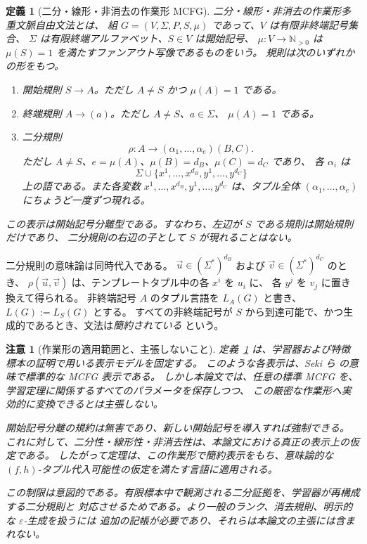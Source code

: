 \documentclass[11pt,a4paper]{ltjsarticle}
\newtheorem{definition}[theorem]{定義}
\newtheorem{remark}[theorem]{注意}
\theoremstyle{remark}
\newcommand{\tuple}[1]{\vec{#1}}
\newcommand{\eps}{\varepsilon}
\begin{document}
\begin{definition}[二分・線形・非消去の作業形 MCFG]
\label{def:working-mcfg}
\emph{二分・線形・非消去の作業形多重文脈自由文法}とは、
組 \(G=(V,\Sigma,P,S,\mu)\) であって、\(V\) は有限非終端記号集合、
\(\Sigma\) は有限終端アルファベット、\(S\in V\) は開始記号、
\(\mu\colon V\to\mathbb N_{>0}\) は \(\mu(S)=1\) を満たすファンアウト写像であるものをいう。
規則は次のいずれかの形をもつ。
\begin{enumerate}[label=(\roman*),leftmargin=*]
\item 開始規則 \(S\to A\)。ただし \(A\ne S\) かつ \(\mu(A)=1\) である。
\item 終端規則 \(A\to(a)\)。ただし \(A\ne S\)、\(a\in\Sigma\)、
\(\mu(A)=1\) である。
\item 二分規則
\[
  \rho\colon A\to(\alpha_1,\ldots,\alpha_e)(B,C).
\]
ただし \(A\ne S\)、\(e=\mu(A)\)、\(\mu(B)=d_B\)、\(\mu(C)=d_C\) であり、
各 \(\alpha_i\) は
\[
  \Sigma\cup\{x^1,\ldots,x^{d_B},y^1,\ldots,y^{d_C}\}
\]
上の語である。また各変数
\(x^1,\ldots,x^{d_B},y^1,\ldots,y^{d_C}\) は、タプル全体
\((\alpha_1,\ldots,\alpha_e)\) にちょうど一度ずつ現れる。
\end{enumerate}
この表示は\emph{開始記号分離型}である。すなわち、左辺が \(S\) である規則は開始規則だけであり、
二分規則の右辺の子として \(S\) が現れることはない。
\end{definition}

二分規則の意味論は同時代入である。
\(\tuple u\in(\Sigma^*)^{d_B}\) および \(\tuple v\in(\Sigma^*)^{d_C}\) のとき、
\(\rho(\tuple u,\tuple v)\) は、テンプレートタプル中の各 \(x^i\) を \(u_i\) に、
各 \(y^j\) を \(v_j\) に置き換えて得られる。
非終端記号 \(A\) のタプル言語を \(L_A(G)\) と書き、\(L(G):=L_S(G)\) とする。
すべての非終端記号が \(S\) から到達可能で、かつ生成的であるとき、文法は\emph{簡約されている}
という。

\begin{remark}[作業形の適用範囲と、主張しないこと]
\label{rem:working-form-scope}
定義~\ref{def:working-mcfg} は、学習器および特徴標本の証明で用いる表示モデルを固定する。
このような各表示は、Seki ら \cite{SekiEtAl1991} の意味で標準的な MCFG 表示である。
しかし本論文では、任意の標準 MCFG を、学習定理に関係するすべてのパラメータを保存しつつ、
この厳密な作業形へ実効的に変換できるとは主張しない。

開始記号分離の規約は無害であり、新しい開始記号を導入すれば強制できる。
これに対して、二分性・線形性・非消去性は、本論文における真正の表示上の仮定である。
したがって定理は、この作業形で簡約表示をもち、意味論的な
\((f,h)\)-タプル代入可能性の仮定を満たす言語に適用される。

この制限は意図的である。有限標本中で観測される二分証拠を、学習器が再構成する二分規則と
対応させるためである。より一般のランク、消去規則、明示的な \(\eps\)-生成を扱うには
追加の記帳が必要であり、それらは本論文の主張には含まれない。
\end{remark}
\end{document}
